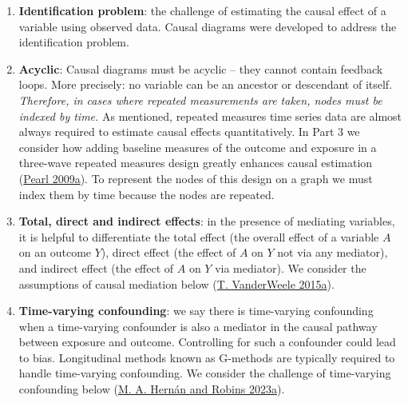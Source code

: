 \documentclass[
  singlecolumn]{article}
\begin{document}
\begin{enumerate}
\def\labelenumi{\arabic{enumi}.}
\setcounter{enumi}{11}
\item
  \textbf{Identification problem}: the challenge of estimating the
  causal effect of a variable using observed data. Causal diagrams were
  developed to address the identification problem.
\item
  \textbf{Acyclic}: Causal diagrams must be acyclic -- they cannot
  contain feedback loops. More precisely: no variable can be an ancestor
  or descendant of itself. \emph{Therefore, in cases where repeated
  measurements are taken, nodes must be indexed by time.} As mentioned,
  repeated measures time series data are almost always required to
  estimate causal effects quantitatively. In Part 3 we consider how
  adding baseline measures of the outcome and exposure in a three-wave
  repeated measures design greatly enhances causal estimation
  (\protect\hyperlink{ref-pearl2009}{Pearl 2009a}). To represent the
  nodes of this design on a graph we must index them by time because the
  nodes are repeated.
\item
  \textbf{Total, direct and indirect effects}: in the presence of
  mediating variables, it is helpful to differentiate the total effect
  (the overall effect of a variable \(A\) on an outcome \(Y\)), direct
  effect (the effect of \(A\) on \(Y\) not via any mediator), and
  indirect effect (the effect of \(A\) on \(Y\) via mediator). We
  consider the assumptions of causal mediation below
  (\protect\hyperlink{ref-vanderweele2015a}{T. VanderWeele 2015a}).
\item
  \textbf{Time-varying confounding}: we say there is time-varying
  confounding when a time-varying confounder is also a mediator in the
  causal pathway between exposure and outcome. Controlling for such a
  confounder could lead to bias. Longitudinal methods known as G-methods
  are typically required to handle time-varying confounding. We consider
  the challenge of time-varying confounding below
  (\protect\hyperlink{ref-hernuxe1n2023}{M. A. Hernán and Robins
  2023a}).
\end{enumerate}
\end{document}
